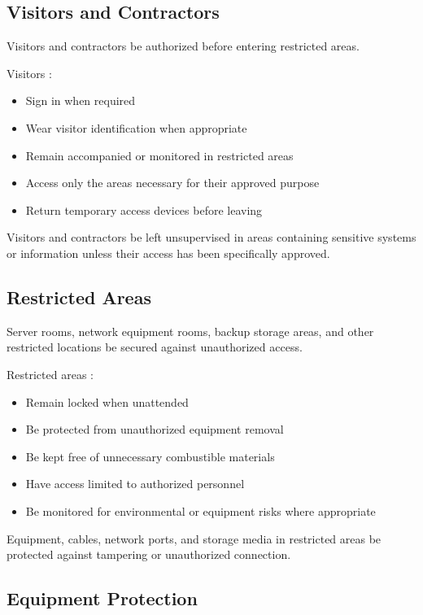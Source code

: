 \subsection{Visitors and Contractors}

Visitors and contractors \must{} be authorized before entering restricted areas.

Visitors \must{}:
\begin{itemize}
    \item Sign in when required
    \item Wear visitor identification when appropriate
    \item Remain accompanied or monitored in restricted areas
    \item Access only the areas necessary for their approved purpose
    \item Return temporary access devices before leaving
\end{itemize}

Visitors and contractors \mustnot{} be left unsupervised in areas containing sensitive systems or information unless their access has been specifically approved.

\subsection{Restricted Areas}

Server rooms, network equipment rooms, backup storage areas, and other restricted locations \must{} be secured against unauthorized access.

Restricted areas \must{}:
\begin{itemize}
    \item Remain locked when unattended
    \item Be protected from unauthorized equipment removal
    \item Be kept free of unnecessary combustible materials
    \item Have access limited to authorized personnel
    \item Be monitored for environmental or equipment risks where appropriate
\end{itemize}

Equipment, cables, network ports, and storage media in restricted areas \must{} be protected against tampering or unauthorized connection.

\subsection{Equipment Protection}

